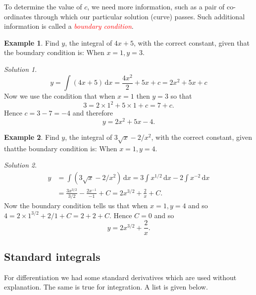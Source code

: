 \documentclass[
  11pt,
  oneside]{book}
\newcommand{\slide}{}
\theoremstyle{definition}
\theoremstyle{definition}
\newtheorem{example}{Example}[chapter]
\theoremstyle{definition}
\theoremstyle{definition}
\theoremstyle{remark}
\newtheorem*{solution}{Solution}
\begin{document}
To determine the value of \(c\), we need more information, such as a pair of co-ordinates through which our particular solution (curve) passes. Such additional information is called a \textcolor{red}{\em boundary condition}.

\slide

\begin{example}
Find \(y\), the integral of \(4x + 5\), with the correct constant, given that the boundary condition is:
When \(x = 1, y = 3\).
\end{example}

\begin{solution}
\[
y = \int(4x+5)\,\mathrm{d}x = \frac{4x^2}{2} + 5x+c = 2x^2+5x+c
\]
Now we use the condition that when \(x=1\) then \(y=3\) so that
\[
3 = 2\times 1^2 + 5\times1 + c = 7+c.
\]
Hence \(c = 3-7=-4\) and therefore
\[
y = 2x^2+5x-4.
\]
\end{solution}

\slide

\begin{example}
Find \(y\), the integral of \(3\sqrt{x} - 2/x^2\), with the correct constant, given thatthe boundary condition is:
When \(x = 1, y = 4\).
\end{example}

\begin{solution}
\begin{align*}
y& = \int(3\sqrt{x}-2/x^2)\,\mathrm{d}x = 3\int x^{1/2}\,\mathrm{d}x - 2\int x^{-2}\,\mathrm{d}x\\
&= \frac{3x^{3/2}}{3/2} - \frac{2x^{-1}}{-1}+C = 2x^{3/2}+\frac2x+C.
\end{align*}
Now the boundary condition tells us that when \(x=1, y = 4\) and so \(4=2\times1^{3/2}+2/1+C = 2+2+C\). Hence \(C=0\) and so
\[
y = 2x^{3/2}+\frac 2x.
\]
\end{solution}

\slide

\subsection{Standard integrals}\label{standard-integrals}

For differentiation we had some standard derivatives which are used without explanation. The same is true for integration. A list is given below.

\slide
\end{document}
